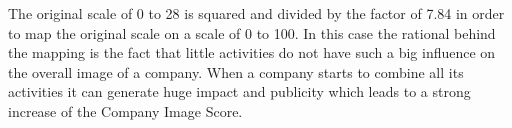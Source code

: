The original scale of 0 to 28 is squared and divided by the factor of 7.84 in order to map the original scale on a scale of 0 to 100. In this case the rational behind the mapping is the fact that little activities do not have such  a big influence on the overall image of a company. When a company starts to combine all its activities it can generate huge impact and publicity which leads to a strong increase of the Company Image Score.